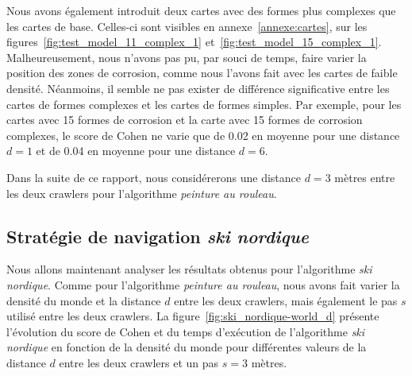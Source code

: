 \documentclass[english,RandD]{rapportPFE}  %
\begin{document}
			Nous avons également introduit deux cartes avec des formes plus complexes que les cartes de base.
			Celles-ci sont visibles en annexe~\ref{annexe:cartes}, sur les figures~\ref{fig:test_model_11_complex_1} et~\ref{fig:test_model_15_complex_1}.
			Malheureusement, nous n'avons pas pu, par souci de temps, faire varier la position des zones de corrosion, comme nous l'avons fait avec les cartes de faible densité.
			Néanmoins, il semble ne pas exister de différence significative entre les cartes de formes complexes et les cartes de formes simples.
			Par exemple, pour les cartes avec 15 formes de corrosion et la carte avec 15 formes de corrosion complexes, le score de Cohen ne varie que de 0.02 en moyenne pour une distance $d = 1$ et de 0.04 en moyenne pour une distance $d = 6$.

			Dans la suite de ce rapport, nous considérerons une distance $d = 3$ mètres entre les deux crawlers pour l'algorithme \textit{peinture au rouleau}.
		\subsection*{Stratégie de navigation \textit{ski nordique}}
			Nous allons maintenant analyser les résultats obtenus pour l'algorithme \textit{ski nordique}.
			Comme pour l'algorithme \textit{peinture au rouleau}, nous avons fait varier la densité du monde et la distance $d$ entre les deux crawlers, mais également le pas $s$ utilisé entre les deux crawlers.
			La figure~\ref{fig:ski_nordique-world_d} présente l'évolution du score de Cohen et du temps d'exécution de l'algorithme \textit{ski nordique} en fonction de la densité du monde pour différentes valeurs de la distance $d$ entre les deux crawlers et un pas $s = 3$ mètres.
\end{document}
